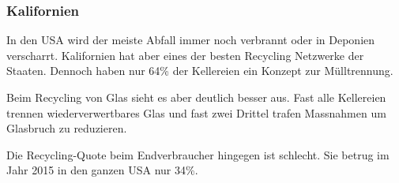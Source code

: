 \subsubsection{Kalifornien}
In den USA wird der meiste Abfall immer noch verbrannt oder in Deponien verscharrt. Kalifornien hat
aber eines der besten Recycling Netzwerke der Staaten. Dennoch haben nur 64\%  der Kellereien ein
Konzept zur Mülltrennung. 

Beim Recycling von Glas sieht es aber deutlich besser aus. Fast alle Kellereien trennen
wiederverwertbares Glas und fast zwei Drittel trafen Massnahmen um Glasbruch zu reduzieren.

\cite{_2015_cswa_sustainability_report.pdf}

Die Recycling-Quote beim Endverbraucher hingegen ist schlecht. Sie betrug im Jahr 2015 in den ganzen
USA nur 34\%. 
